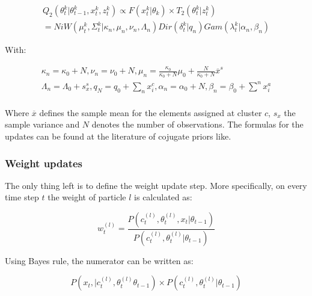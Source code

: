 \documentclass[]{article}
\begin{document}
    \begin{equation} \label{Q_2}
        \begin{split}
            Q_2(\theta_t^k | \theta_{t-1}^k , x_t^k, z_t^k) \propto F( x_t^k | \theta_k) \times T_2(\theta_t^k | z_t^k) \\
            = NiW( \mu_t^k, \Sigma_t^k | \kappa_n, \mu_n, \nu_n, \Lambda_n ) Dir(\delta_t^k | q_n) Gam(\lambda_t^k | \alpha_n, \beta_n)
        \end{split}
    \end{equation}

    With:

    \begin{equation} \label{udpates}
        \begin{split}
            \kappa_n = \kappa_0 + N, 
            \nu_n = \nu_0 + N, 
            \mu_n = \frac{\kappa_0}{\kappa_0 + N} \mu_0 +  \frac{N}{\kappa_0 + N} \overline{x}^s\\
            \Lambda_n = \Lambda_0 + s_{x}^s,
            q_N = q_0 +  \sum_n x_i^c,
            \alpha_n = \alpha_0 +  N,
            \beta_n = \beta_0 +  \sum^n x_i^a\\
        \end{split}
    \end{equation}


    Where $\overline{x}$ defines the sample mean for the elements assigned at cluster $c$, $s_{x}$ the sample variance and $N$ denotes the number of observations. The formulas for the updates can be found at the literature of cojugate priors like\cite{conjugate}.

    \subsubsection{Weight updates}

    The only thing left is to define the weight update step. More specifically, on every time step $t$ the weight of particle $l$ is calculated as:

    \begin{equation}
        w_t^{(l)} = \frac {P(c_t^{(l)} , \theta_t^{(l)}, x_t| 	\theta_{t-1} )}{P(c_t^{(l)} , \theta_t^{(l)}| 	\theta_{t-1} )}
    \end{equation}

    Using Bayes rule, the numerator can be written as:

    \begin{equation}
        P(x_t , | c_t^{(l)} , \theta_t^{(l)} \theta_{t-1} ) \times P(c_t^{(l)} , \theta_t^{(l)}|  \theta_{t-1} )
    \end{equation}
\end{document}
